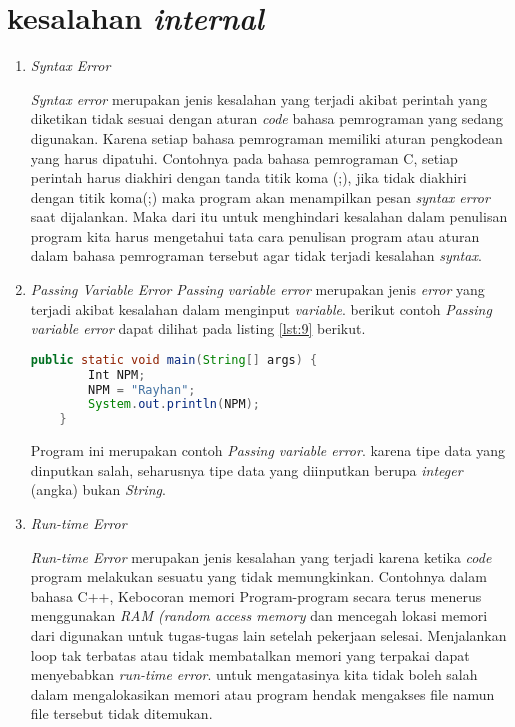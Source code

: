 \section{kesalahan \textit{internal}}
\begin{enumerate}
\item \textit{Syntax Error}
\par 
\textit{Syntax error} merupakan jenis kesalahan yang terjadi akibat perintah yang diketikan tidak sesuai dengan aturan \textit{code} bahasa pemrograman yang sedang digunakan. Karena setiap bahasa pemrograman memiliki aturan pengkodean yang harus dipatuhi. Contohnya pada bahasa pemrograman C, setiap perintah harus diakhiri dengan tanda titik koma (;), jika tidak diakhiri dengan titik koma(;) maka program akan menampilkan pesan \textit{syntax error} saat dijalankan. Maka dari itu untuk menghindari kesalahan dalam penulisan program kita harus mengetahui tata cara penulisan program atau aturan dalam bahasa pemrograman tersebut agar tidak terjadi kesalahan \textit{syntax}.

\item \textit{Passing Variable Error}
\textit{Passing variable error} merupakan jenis \textit{error} yang terjadi akibat kesalahan dalam menginput \textit{variable}. berikut contoh \textit{Passing variable error} dapat dilihat pada listing \ref{lst:9} berikut.
\begin{lstlisting}[language=Java, caption=Contoh \textit{passing variable error},label={lst:9}]
public static void main(String[] args) {	
		Int NPM;		
		NPM = "Rayhan";
		System.out.println(NPM);
	}
\end{lstlisting}
Program ini merupakan contoh \textit{Passing variable error}. karena tipe data yang dinputkan salah, seharusnya tipe data yang diinputkan berupa \textit{integer} (angka) bukan \textit{String}.

\item \textit{Run-time Error}
\par
\textit{Run-time Error} merupakan jenis kesalahan yang terjadi karena ketika \textit{code} program melakukan sesuatu yang tidak memungkinkan. Contohnya dalam bahasa C++, Kebocoran memori Program-program secara terus menerus menggunakan \textit{RAM (random access memory} dan mencegah lokasi memori dari digunakan untuk tugas-tugas lain setelah pekerjaan selesai. Menjalankan loop tak terbatas atau tidak membatalkan memori yang terpakai dapat menyebabkan \textit{run-time error}. untuk mengatasinya kita tidak boleh salah dalam mengalokasikan memori atau program hendak mengakses file namun file tersebut tidak ditemukan.


\end{enumerate}
